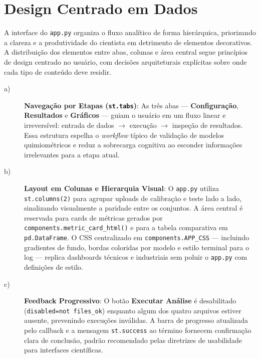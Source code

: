 \section{Design Centrado em Dados}

A interface do \texttt{app.py} organiza o fluxo analítico de forma hierárquica,
priorizando a clareza e a produtividade do cientista em detrimento de elementos
decorativos. A distribuição dos elementos entre abas, colunas e área central segue
princípios de design centrado no usuário, com decisões arquiteturais explícitas sobre
onde cada tipo de conteúdo deve residir.

\begin{description}

\item[a)] \textbf{Navegação por Etapas (\texttt{st.tabs})}: As três abas —
\textbf{Configuração}, \textbf{Resultados} e \textbf{Gráficos} — guiam o usuário em um
fluxo linear e irreversível: entrada de dados $\rightarrow$ execução $\rightarrow$
inspeção de resultados. Essa estrutura espelha o \textit{workflow} típico de validação de
modelos quimiométricos e reduz a sobrecarga cognitiva ao esconder informações irrelevantes
para a etapa atual.

\item[b)] \textbf{Layout em Colunas e Hierarquia Visual}: O \texttt{app.py} utiliza
\texttt{st.columns(2)} para agrupar uploads de calibração e teste lado a lado,
sinalizando visualmente a paridade entre os conjuntos. A área central é reservada para
cards de métricas gerados por \texttt{components.metric\_card\_html()} e para a tabela
comparativa em \texttt{pd.DataFrame}. O CSS centralizado em \texttt{components.APP\_CSS}
— incluindo gradientes de fundo, bordas coloridas por modelo e estilo terminal para o
log — replica dashboards técnicos e industriais sem poluir o \texttt{app.py} com
definições de estilo.

\item[c)] \textbf{Feedback Progressivo}: O botão \textbf{Executar Análise} é
desabilitado (\texttt{disabled=not files\_ok}) enquanto algum dos quatro arquivos estiver
ausente, prevenindo execuções inválidas. A barra de progresso atualizada pelo callback e
a mensagem \texttt{st.success} ao término fornecem confirmação clara de conclusão,
padrão recomendado pelas diretrizes de usabilidade para interfaces científicas.


\end{description}
